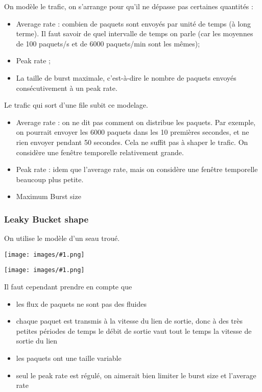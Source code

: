 \documentclass[10pt,a4paper]{report}
\newcommand{\dessin}[1]{\begin{center}\texttt{[image: images/\#1.png]}\end{center}}
\begin{document}
		On modèle le trafic, on s'arrange pour qu'il ne dépasse pas certaines quantités :
		
		\begin{itemize}
			\item Average rate : combien de paquets sont envoyés par unité de temps (à long terme). Il faut savoir de quel intervalle de temps on parle (car les moyennes de 100 paquets/s et de 6000 paquets/min sont les mêmes); 
			\item Peak rate ;
			\item La taille de burst maximale, c'est-à-dire le nombre de paquets envoyés consécutivement à un peak rate.
		\end{itemize}
		
		Le trafic qui sort d'une file subit ce modelage.
		
		
		\begin{itemize}
			\item Average rate : on ne dit pas comment on distribue les paquets. Par exemple, on pourrait envoyer les 6000 paquets dans les 10 premières secondes, et ne rien envoyer pendant 50 secondes. Cela ne suffit pas à shaper le trafic. On considère une fenêtre temporelle relativement grande.
			\item Peak rate : idem que l'average rate, mais on considère une fenêtre temporelle beaucoup plus petite.

			\item Maximum Burst size
		\end{itemize}				
		
			\subsubsection{Leaky Bucket shape}
			
			On utilise le modèle d'un seau troué.
			
			\dessin{102}
			
			\dessin{103}
		
			Il faut cependant prendre en compte que
			
			
			
			
			\begin{itemize}
				\item les flux de paquets ne sont pas des fluides
				\item chaque paquet est transmis à la vitesse du lien de sortie, donc à des très petites périodes de temps le débit de sortie vaut tout le temps la vitesse de sortie du lien
				\item les paquets ont une taille variable
				\item seul le peak rate est régulé, on aimerait bien limiter le burst size et l'average rate
			\end{itemize}
			
\end{document}
